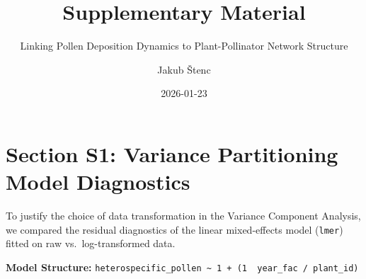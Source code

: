 \documentclass[
  letterpaper,
  DIV=11,
  numbers=noendperiod]{scrartcl}
\title{Supplementary Material}
\subtitle{Linking Pollen Deposition Dynamics to Plant-Pollinator Network
Structure}
\author{Jakub Štenc}
\date{2026-01-23}
\renewcommand*\contentsname{Table of contents}
\newcommand\contentsname{Table of contents}
\begin{document}
\maketitle

\renewcommand*\contentsname{Table of contents}
{
\hypersetup{linkcolor=}
\setcounter{tocdepth}{3}
\tableofcontents
}

\section{Section S1: Variance Partitioning Model
Diagnostics}\label{section-s1-variance-partitioning-model-diagnostics}

To justify the choice of data transformation in the Variance Component
Analysis, we compared the residual diagnostics of the linear
mixed-effects model (\texttt{lmer}) fitted on raw vs.~log-transformed
data.

\textbf{Model Structure:}
\texttt{heterospecific\_pollen\ \textasciitilde{}\ 1\ +\ (1\ \textbar{}\ year\_fac\ /\ plant\_id)}
\end{document}
